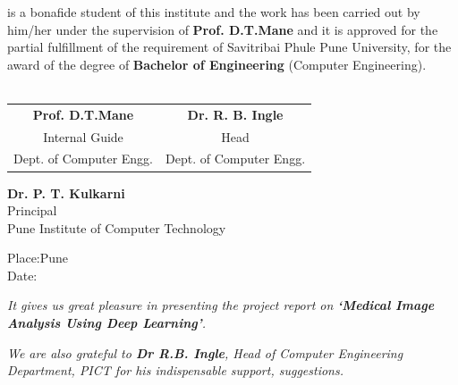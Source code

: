\documentclass[oneside,a4paper,12pt]{book}
\begin{document}
is a bonafide student of this institute and the work has been carried out by him/her under the supervision of  \textbf{Prof. D.T.Mane} and it is approved for the partial fulfillment of the requirement of Savitribai Phule Pune University, for the award of the degree of \textbf{Bachelor of Engineering} (Computer Engineering). \\
\\
\vskip 1cm
\bgroup
\def\arraystretch{0.7}
\begin{tabular}{c c }
\textbf{Prof. D.T.Mane} &  \hspace{50 mm} \textbf{Dr. R. B. Ingle} \\
Internal Guide   &  \hspace{50 mm} Head \\
Dept. of Computer Engg.  &	\hspace{50 mm}Dept. of Computer Engg.  \\
\end{tabular}
\begin{center}
\vspace*{1\baselineskip}
{

\textbf{Dr. P. T. Kulkarni}\\
Principal\\
Pune Institute of Computer Technology  
}
\end{center}
Place:Pune\\
Date:





{   \setlength{\parindent}{11mm} }
{ \setlength{\parindent}{0mm} }
\textit{It gives us great pleasure in presenting the project report 
on {\bfseries \fontsize{12}{12} \selectfont `Medical Image Analysis Using Deep Learning'}.}
\vspace*{1.5\baselineskip}

 \vspace*{1.5\baselineskip}

 \textit{We are also grateful to \textbf{Dr R.B. Ingle}, Head of Computer
 Engineering Department, PICT for his indispensable
 support, suggestions.}
\vspace*{1.5\baselineskip}
\end{document}
